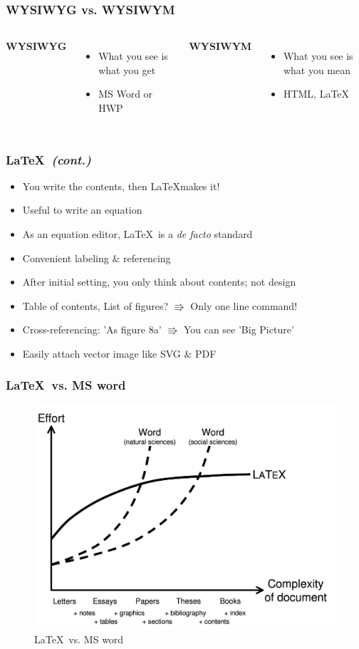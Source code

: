 \documentclass{beamer}
\begin{document}
\begin{frame}
    \frametitle{WYSIWYG vs. WYSIWYM}
    \begin{columns}[c]
        \textbf{WYSIWYG}
        \begin{itemize}
            \item What you see is what you get
            \item MS Word or HWP
        \end{itemize}
        
        \textbf{WYSIWYM}
        \begin{itemize}
            \item What you see is what you mean
            \item HTML, \LaTeX
        \end{itemize}
    \end{columns}
\end{frame}

\begin{frame}
    \frametitle{\LaTeX\ \textit{(cont.)}}
    \begin{itemize}
        \item You write the contents, then \LaTeX makes it!\
        \item Useful to write an equation
        \item As an equation editor, \LaTeX\ is a \textit{de facto} standard
        \item Convenient labeling \& referencing
        \item After initial setting, you only think about contents; not design
        \item Table of contents, List of figures? $\Rrightarrow$ Only one line command!
        \item Cross-referencing: 'As figure 8a' $\Rrightarrow$ You can see 'Big Picture'
        \item Easily attach vector image like SVG \& PDF
    \end{itemize}
\end{frame}

\begin{frame}
    \frametitle{\LaTeX\ vs. MS word}
    \begin{figure}[h!]
        \centering
        \includegraphics[width=.5 \linewidth]{figures/texvsword.jpg}
        \caption{\LaTeX\ vs. MS word}
    \end{figure}
\end{frame}
\end{document}
